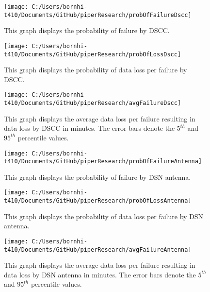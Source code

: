 \documentclass[aps,twocolumn,nobalancelastpage,amsmath,amssymb,
nofootinbib,superscriptaddress, ]{revtex4}
\begin{document}
\begin{figure}[h]
\texttt{[image: C:/Users/bornhi-t410/Documents/GitHub/piperResearch/probOfFailureDscc]}
\caption{This graph displays the probability of failure by DSCC.\label{fig:fig8}}
\end{figure}

\begin{figure}[h]
\texttt{[image: C:/Users/bornhi-t410/Documents/GitHub/piperResearch/probOfLossDscc]}
\caption{This graph displays the probability of data loss per failure by DSCC. \label{fig:fig9}}
\end{figure}

\begin{figure}[h]
\texttt{[image: C:/Users/bornhi-t410/Documents/GitHub/piperResearch/avgFailureDscc]}
\caption{This graph displays the average data loss per failure resulting in data loss by DSCC in minutes. The error bars denote the $5^{th}$ and $95^{th}$ percentile values. \label{fig:fig10}}
\end{figure}

\begin{figure}[h]
\texttt{[image: C:/Users/bornhi-t410/Documents/GitHub/piperResearch/probOfFailureAntenna]}
\caption{This graph displays the probability of failure by DSN antenna.\label{fig:fig11}}
\end{figure}

\begin{figure}[h]
\texttt{[image: C:/Users/bornhi-t410/Documents/GitHub/piperResearch/probOfLossAntenna]}
\caption{This graph displays the probability of data loss per failure by DSN antenna. \label{fig:fig12}}
\end{figure}

\begin{figure}[h]
\texttt{[image: C:/Users/bornhi-t410/Documents/GitHub/piperResearch/avgFailureAntenna]}
\caption{This graph displays the average data loss per failure resulting in data loss by DSN antenna in minutes. The error bars denote the $5^{th}$ and $95^{th}$ percentile values. \label{fig:fig13}}
\end{figure}
\end{document}
